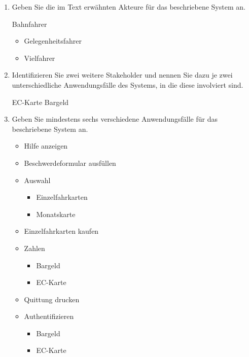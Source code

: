 \documentclass{lehramt-informatik-aufgabe}
\begin{document}
\begin{enumerate}


\item Geben Sie die im Text erwähnten Akteure für das beschriebene
System an.

\begin{liAntwort}
Bahnfahrer

\begin{itemize}
\item Gelegenheitsfahrer

\item Vielfahrer
\end{itemize}
\end{liAntwort}


\item Identifizieren Sie zwei weitere Stakeholder und nennen Sie dazu je
zwei unterschiedliche Anwendungsfälle des Systems, in die diese
involviert sind.

\begin{liAntwort}
EC-Karte
Bargeld
\end{liAntwort}


\item Geben Sie mindestens sechs verschiedene Anwendungsfälle für das
beschriebene System an.

\begin{liAntwort}
\begin{itemize}
\item Hilfe anzeigen
\item Beschwerdeformular ausfüllen
\item Auswahl
\begin{itemize}
\item Einzelfahrkarten
\item Monatskarte
\end{itemize}
\item Einzelfahrkarten kaufen
\item Zahlen
\begin{itemize}
\item Bargeld
\item EC-Karte
\end{itemize}
\item Quittung drucken
\item Authentifizieren

\begin{itemize}
\item Bargeld
\item EC-Karte
\end{itemize}
\end{itemize}
\end{liAntwort}


\end{enumerate}
\end{document}
